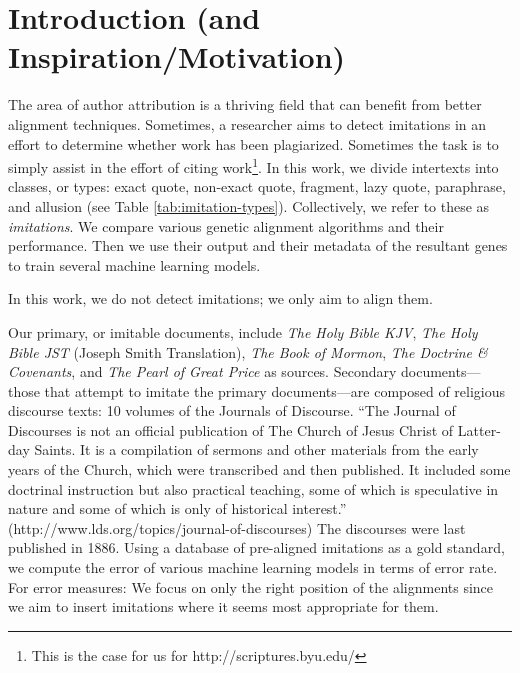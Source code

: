 \section {Introduction (and Inspiration/Motivation)}

The area of author attribution is a thriving field that can benefit from better alignment techniques. Sometimes, a researcher aims to detect imitations in an effort to determine whether work has been plagiarized. Sometimes the task is to simply assist in the effort of citing work\footnote{This is the case for us for http://scriptures.byu.edu/}. In this work, we divide intertexts into classes, or types: exact quote, non-exact quote, fragment, lazy quote, paraphrase, and allusion (see Table \ref{tab:imitation-types}). Collectively, we refer to these as \textit{imitations}. We compare various genetic alignment algorithms and their performance. Then we use their output and their metadata of the resultant genes to train several machine learning models. 

In this work, we do not detect imitations; we only aim to align them. 

Our primary, or imitable documents, include \textit{The Holy Bible KJV}, \textit{The Holy Bible JST} (Joseph Smith Translation), \textit{The Book of Mormon}, \textit{The Doctrine \& Covenants}, and \textit{The Pearl of Great Price} as sources. Secondary documents---those that attempt to imitate the primary documents---are composed of religious discourse texts: 10 volumes of the Journals of Discourse. ``The Journal of Discourses is not an official publication of The Church of Jesus Christ of Latter-day Saints. It is a compilation of sermons and other materials from the early years of the Church, which were transcribed and then published. It included some doctrinal instruction but also practical teaching, some of which is speculative in nature and some of which is only of historical interest.'' (http://www.lds.org/topics/journal-of-discourses) The discourses were last published in 1886. Using a database of pre-aligned imitations as a gold standard, we compute the error of various machine learning models in terms of error rate. For error measures: We focus on only the right position of the alignments since we aim to insert imitations where it seems most appropriate for them.

